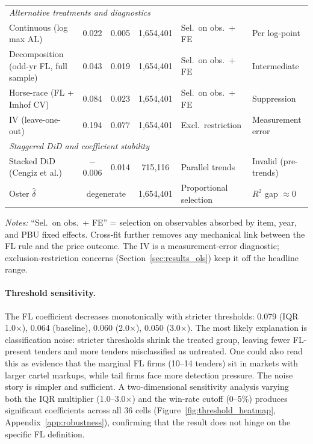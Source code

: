 \begin{table}[htbp]
\begin{tabular}{lcccll}
\hline
\multicolumn{6}{l}{\textit{Alternative treatments and diagnostics}} \\
Continuous (log max AL) & 0.022 & 0.005 & 1{,}654{,}401 & Sel.\ on obs.\ + FE & Per log-point \\
Decomposition (odd-yr FL, full sample) & 0.043 & 0.019 & 1{,}654{,}401 & Sel.\ on obs.\ + FE & Intermediate \\
Horse-race (FL + Imhof CV) & 0.084 & 0.023 & 1{,}654{,}401 & Sel.\ on obs.\ + FE & Suppression \\
IV (leave-one-out) & 0.194 & 0.077 & 1{,}654{,}401 & Excl.\ restriction & Measurement error \\
\hline
\multicolumn{6}{l}{\textit{Staggered DiD and coefficient stability}} \\
Stacked DiD (Cengiz et al.) & $-$0.006 & 0.014 & 715{,}116 & Parallel trends & Invalid (pre-trends) \\
Oster $\hat{\delta}$ & \multicolumn{2}{c}{degenerate} & 1{,}654{,}401 & Proportional selection & $R^2$ gap $\approx 0$ \\
\hline\hline
\end{tabular}
\begin{tablenotes}
\small
\item \textit{Notes:} ``Sel.\ on obs.\ + FE'' = selection on observables absorbed by item, year, and PBU fixed effects. Cross-fit further removes any mechanical link between the FL rule and the price outcome. The IV is a measurement-error diagnostic; exclusion-restriction concerns (Section~\ref{sec:results_ols}) keep it off the headline range.
\end{tablenotes}
\end{table}


\paragraph{Threshold sensitivity.}
The FL coefficient decreases monotonically with stricter thresholds:
0.079 (IQR 1.0$\times$), 0.064 (baseline), 0.060 (2.0$\times$),
0.050 (3.0$\times$). The most likely explanation is classification noise: stricter
thresholds shrink the treated group, leaving fewer FL-present tenders
and more tenders misclassified as untreated. One could also read this
as evidence that the marginal FL firms (10--14 tenders) sit in markets
with larger cartel markups, while tail firms face more detection
pressure. The noise story is simpler and sufficient. A
two-dimensional sensitivity analysis varying both the IQR multiplier
(1.0--3.0$\times$) and the win-rate cutoff (0--5\%) produces
significant coefficients across all 36 cells
(Figure~\ref{fig:threshold_heatmap}, Appendix~\ref{app:robustness}),
confirming that the result does not hinge on the specific FL
definition.

